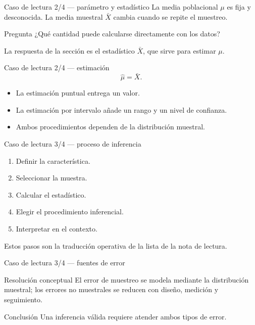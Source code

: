 \documentclass[10pt,aspectratio=169]{beamer}
\begin{document}
\begin{frame}{Caso de lectura 2/4 --- parámetro y estadístico}
  \footnotesize
  La media poblacional $\mu$ es fija y desconocida. La media muestral $\bar X$
  cambia cuando se repite el muestreo.
  \begin{block}{Pregunta}
    ¿Qué cantidad puede calcularse directamente con los datos?
  \end{block}
  La respuesta de la sección es el estadístico $\bar X$, que sirve para estimar
  $\mu$.
\end{frame}

\begin{frame}{Caso de lectura 2/4 --- estimación}
  \footnotesize
  \[
    \widehat{\mu}=\bar X.
  \]
  \begin{itemize}\itemsep=0.12cm
    \item La estimación puntual entrega un valor.
    \item La estimación por intervalo añade un rango y un nivel de confianza.
    \item Ambos procedimientos dependen de la distribución muestral.
  \end{itemize}
\end{frame}

\begin{frame}{Caso de lectura 3/4 --- proceso de inferencia}
  \footnotesize
  \begin{enumerate}\itemsep=0.13cm
    \item Definir la característica.
    \item Seleccionar la muestra.
    \item Calcular el estadístico.
    \item Elegir el procedimiento inferencial.
    \item Interpretar en el contexto.
  \end{enumerate}
  Estos pasos son la traducción operativa de la lista de la nota de lectura.
\end{frame}

\begin{frame}{Caso de lectura 3/4 --- fuentes de error}
  \footnotesize
  \begin{block}{Resolución conceptual}
    El error de muestreo se modela mediante la distribución muestral; los
    errores no muestrales se reducen con diseño, medición y seguimiento.
  \end{block}
  \begin{alertblock}{Conclusión}
    Una inferencia válida requiere atender ambos tipos de error.
  \end{alertblock}
\end{frame}
\end{document}
